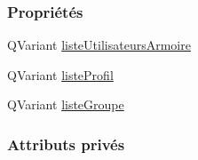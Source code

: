 \subsubsection*{Propriétés}
\begin{DoxyCompactItemize}
\item 
Q\+Variant \hyperlink{class_utilisateurs_armoire_a8ba4ea6592f6588ab1cd0ddce7dc744d}{liste\+Utilisateurs\+Armoire}
\item 
Q\+Variant \hyperlink{class_utilisateurs_armoire_a377e5cc73178d05cdad23d8d84ae28a4}{liste\+Profil}
\item 
Q\+Variant \hyperlink{class_utilisateurs_armoire_a3012f6f272b32aa9a9cf6cc05dc129f5}{liste\+Groupe}
\end{DoxyCompactItemize}
\subsubsection*{Attributs privés}
